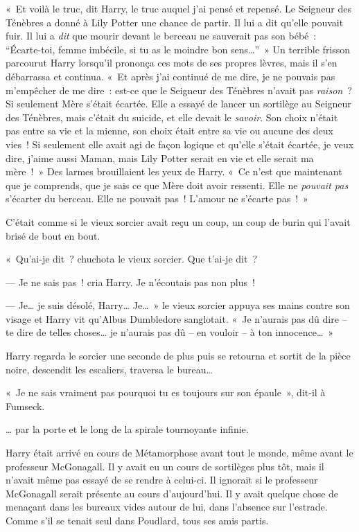 «~Et voilà le truc, dit Harry, le truc auquel j'ai pensé et repensé. Le Seigneur des Ténèbres a donné à Lily Potter une chance de partir. Il lui a dit qu'elle pouvait fuir. Il lui a \emph{dit} que mourir devant le berceau ne sauverait pas son bébé~: “Écarte-toi, femme imbécile, si tu as le moindre bon sens…”~» Un terrible frisson parcourut Harry lorsqu'il prononça ces mots de ses propres lèvres, mais il s'en débarrassa et continua. «~Et après j'ai continué de me dire, je ne pouvais pas m'empêcher de me dire~: est-ce que le Seigneur des Ténèbres n'avait pas \emph{raison}~? Si seulement Mère s'était écartée. Elle a essayé de lancer un sortilège au Seigneur des Ténèbres, mais c'était du suicide, et elle devait le \emph{savoir}. Son choix n'était pas entre sa vie et la mienne, son choix était entre sa vie ou aucune des deux vies~! Si seulement elle avait agi de façon logique et qu'elle s'était écartée, je veux dire, j'aime aussi Maman, mais Lily Potter serait en vie et elle serait ma mère~!~» Des larmes brouillaient les yeux de Harry. «~Ce n'est que maintenant que je comprends, que je sais ce que Mère doit avoir ressenti. Elle ne \emph{pouvait pas} s'écarter du berceau. Elle ne pouvait pas~! L'amour ne s'écarte pas~!~»

C'était comme si le vieux sorcier avait reçu un coup, un coup de burin qui l'avait brisé de bout en bout.

«~Qu'ai-je dit~? chuchota le vieux sorcier. Que t'ai-je dit~?

--- Je ne sais pas~! cria Harry. Je n'écoutais pas non plus~!

--- Je… je suis désolé, Harry… Je…~» le vieux sorcier appuya ses mains contre son visage et Harry vit qu'Albus Dumbledore sanglotait. «~Je n'aurais pas dû dire -- te dire de telles choses… je n'aurais pas dû -- en vouloir -- à ton innocence…~»

Harry regarda le sorcier une seconde de plus puis se retourna et sortit de la pièce noire, descendit les escaliers, traversa le bureau…

«~Je ne sais vraiment pas pourquoi tu es toujours sur son épaule~», dit-il à Fumseck.

… par la porte et le long de la spirale tournoyante infinie.

\later

Harry était arrivé en cours de Métamorphose avant tout le monde, même avant le professeur McGonagall. Il y avait eu un cours de sortilèges plus tôt, mais il n'avait même pas essayé de se rendre à celui-ci. Il ignorait si le professeur McGonagall serait présente au cours d'aujourd'hui. Il y avait quelque chose de menaçant dans les bureaux vides autour de lui, dans l'absence sur l'estrade. Comme s'il se tenait seul dans Poudlard, tous ses amis partis.

